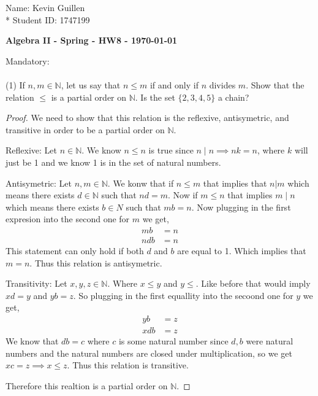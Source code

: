 \documentclass[12pt]{article}
\newcommand      {\N}         {{\mathbb N}}
\begin{document}
\begin{flushright}
    Name: Kevin Guillen \\*
    Student ID: 1747199
\end{flushright}
\begin{center}
    {\bf Algebra II - Spring - HW8 - \today}
\end{center}

\noindent Mandatory:\\
\\
(1) If $n,m\in\N$, let us say that $n\leq m$ if and only if $n$ divides $m$. Show that the relation $\leq$ is a partial order on $\N$. Is the set $\{2,3,4,5\}$ a chain?\\
\begin{proof}
	We need to show that this relation is the reflexive, antisymetric, and transitive in order to be a partial order on $\N$.

	Reflexive: Let $n \in \N$. We know $n\leq n$ is true since $n\mid n \implies nk = n$, where $k$ will just be 1 and we know 1 is in the set of natural numbers.

	Antisymetric: Let $n,m\in \N$. We konw that if $n\leq m$ that implies that $n|m$ which means there exists $d\in \N$ such that $nd = m$. Now if $m \leq n$ that implies $m\mid n$ which means there exists $b\in N$ such that $mb = n$. Now plugging in the first expresion into the second one for $m$ we get,
	\begin{align*}
		mb &= n \\
		ndb &= n
	\end{align*}
	This statement can only hold if both $d$ and $b$ are equal to 1. Which implies that $m = n$. Thus this relation is antisymetric. 

	Transitivity: Let $x,y,z \in \N$. Where $x\leq y$ and $y\leq$. Like before that would imply $xd = y$ and $yb = z$. So plugging in the first equallity into the secoond one for $y$ we get,
	\begin{align*}
		yb &=z \\
		xdb &= z
	\end{align*}
	We know that $db = c$ where $c$ is some natural number since $d,b$ were natural numbers and the natural numbers are closed under multiplication, so we get $xc = z \implies x \leq z$. Thus this relation is transitive.

	Therefore this realtion is a partial order on $\N$.
\end{proof}
\end{document}
